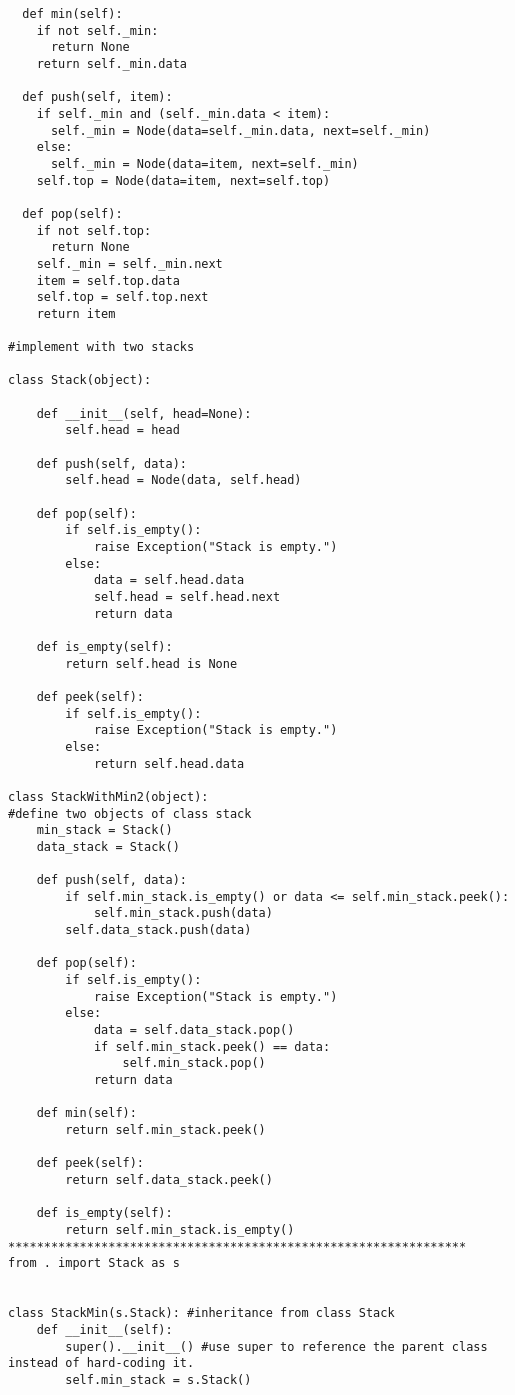 \documentclass[12pt]{article}
\begin{document}
\begin{lstlisting}
  def min(self):
    if not self._min:
      return None
    return self._min.data
    
  def push(self, item):
    if self._min and (self._min.data < item):
      self._min = Node(data=self._min.data, next=self._min)
    else:
      self._min = Node(data=item, next=self._min)
    self.top = Node(data=item, next=self.top)
  
  def pop(self):
    if not self.top:
      return None
    self._min = self._min.next
    item = self.top.data
    self.top = self.top.next
    return item

#implement with two stacks

class Stack(object):

    def __init__(self, head=None):
        self.head = head

    def push(self, data):
        self.head = Node(data, self.head)

    def pop(self):
        if self.is_empty():
            raise Exception("Stack is empty.")
        else:
            data = self.head.data
            self.head = self.head.next
            return data

    def is_empty(self):
        return self.head is None

    def peek(self):
        if self.is_empty():
            raise Exception("Stack is empty.")
        else:
            return self.head.data

class StackWithMin2(object):
#define two objects of class stack
    min_stack = Stack()
    data_stack = Stack()

    def push(self, data):
        if self.min_stack.is_empty() or data <= self.min_stack.peek():
            self.min_stack.push(data)
        self.data_stack.push(data)        

    def pop(self):
        if self.is_empty():
            raise Exception("Stack is empty.")
        else:
            data = self.data_stack.pop()
            if self.min_stack.peek() == data:
                self.min_stack.pop()
            return data

    def min(self):
        return self.min_stack.peek()

    def peek(self):
        return self.data_stack.peek()

    def is_empty(self):
        return self.min_stack.is_empty()
****************************************************************
from . import Stack as s


class StackMin(s.Stack): #inheritance from class Stack
    def __init__(self):
        super().__init__() #use super to reference the parent class instead of hard-coding it.
        self.min_stack = s.Stack()


\end{lstlisting}
\end{document}
